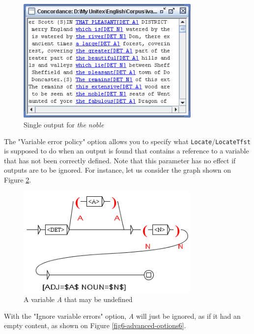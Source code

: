 \bigskip
\begin{figure}[!h]
\begin{center}
\includegraphics[width=9cm]{resources/img/fig6-advanced-options4.png}
\caption{Single output for \textit{the noble}\label{fig6-advanced-options4}}
\end{center}
\end{figure}


\bigskip
\noindent The "Variable error policy" option allows you to specify what
\verb+Locate+/\verb+LocateTfst+ is supposed to do when an output is found that
contains a reference to a variable that has not been correctly defined. Note
that this parameter has no effect if outputs are to be ignored. 
For instance, let us consider the graph shown on Figure
\ref{fig6-advanced-options5}. 

\bigskip
\begin{figure}[!h]
\begin{center}
\includegraphics[width=9cm]{resources/img/fig6-advanced-options5.png}
\caption{A variable \textit{A} that may be
undefined\label{fig6-advanced-options5}}
\end{center}
\end{figure}

\noindent With the "Ignore variable errors" option, \textit{A} will just be
ignored, as if it had an empty content, as shown on Figure
\ref{fig6-advanced-options6}. 

